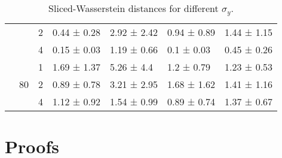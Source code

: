 \begin{table}[ht]
\begin{tabular}{lllllll}
         &  & 2 & 0.44 ± 0.28 & 2.92 ± 2.42 & 0.94 ± 0.89 & 1.44 ± 1.15 \\
         &  & 4 & 0.15 ± 0.03 & 1.19 ± 0.66 & 0.1 ± 0.03 & 0.45 ± 0.26 \\
        \cline{2-7}
         & \multirow[t]{3}{*}{80} & 1 & 1.69 ± 1.37 & 5.26 ± 4.4 & 1.2 ± 0.79 & 1.23 ± 0.53 \\
         &  & 2 & 0.89 ± 0.78 & 3.21 ± 2.95 & 1.68 ± 1.62 & 1.41 ± 1.16 \\
         &  & 4 & 1.12 ± 0.92 & 1.54 ± 0.99 & 0.89 ± 0.74 & 1.37 ± 0.67 \\
        \cline{1-7} \cline{2-7}
        \bottomrule
    \end{tabular}
    \caption{Sliced-Wasserstein distances for different $\sigma_y$.}
    \label{tab:gmm-sigma-split}
\end{table}

\newpage

\section{Proofs}\label{sec:proofs}


